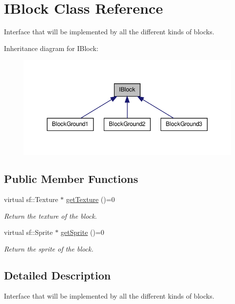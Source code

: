 \hypertarget{class_i_block}{\section{I\-Block Class Reference}
\label{class_i_block}
}


Interface that will be implemented by all the different kinds of blocks.  




Inheritance diagram for I\-Block\-:\nopagebreak
\begin{figure}[H]
\begin{center}
\leavevmode
\includegraphics[width=350pt]{class_i_block__inherit__graph}
\end{center}
\end{figure}
\subsection*{Public Member Functions}
\begin{DoxyCompactItemize}
\item 
virtual sf\-::\-Texture $\ast$ \hyperlink{class_i_block_ac789384b5d6c070c4f4c6a9c65906826}{get\-Texture} ()=0
\begin{DoxyCompactList}\small\item\em Return the texture of the block. \end{DoxyCompactList}\item 
virtual sf\-::\-Sprite $\ast$ \hyperlink{class_i_block_a76ae337b47bb084b2c143a24fdc47093}{get\-Sprite} ()=0
\begin{DoxyCompactList}\small\item\em Return the sprite of the block. \end{DoxyCompactList}\end{DoxyCompactItemize}


\subsection{Detailed Description}
Interface that will be implemented by all the different kinds of blocks. 

